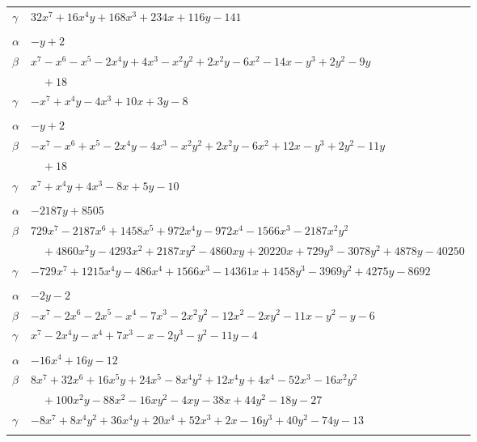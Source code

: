\documentclass[11pt]{article}
\begin{document}
\begin{longtable}{@{}ll@{}}
$\gamma$ & $32x^{7}+16x^{4}y+168x^{3}+234x+116y-141$\\
\addlinespace[3pt]
\multicolumn{2}{@{}l}{$\{i,j\}=\{20,31\}$, $k_{ij}=2\cdot 3$}\\
$\alpha$ & $-y+2$\\
$\beta$ & $x^{7}-x^{6}-x^{5}-2x^{4}y+4x^{3}-x^{2}y^{2}+2x^{2}y-6x^{2}-14x-y^{3}+2y^{2}-9y$\\
 & $\quad +18$\\
$\gamma$ & $-x^{7}+x^{4}y-4x^{3}+10x+3y-8$\\
\addlinespace[3pt]
\multicolumn{2}{@{}l}{$\{i,j\}=\{20,34\}$, $k_{ij}=2^{3}$}\\
$\alpha$ & $-y+2$\\
$\beta$ & $-x^{7}-x^{6}+x^{5}-2x^{4}y-4x^{3}-x^{2}y^{2}+2x^{2}y-6x^{2}+12x-y^{3}+2y^{2}-11y$\\
 & $\quad +18$\\
$\gamma$ & $x^{7}+x^{4}y+4x^{3}-8x+5y-10$\\
\addlinespace[3pt]
\multicolumn{2}{@{}l}{$\{i,j\}=\{21,35\}$, $k_{ij}=11\cdot 17$}\\
$\alpha$ & $-2187y+8505$\\
$\beta$ & $729x^{7}-2187x^{6}+1458x^{5}+972x^{4}y-972x^{4}-1566x^{3}-2187x^{2}y^{2}$\\
 & $\quad +4860x^{2}y-4293x^{2}+2187xy^{2}-4860xy+20220x+729y^{3}-3078y^{2}+4878y-40250$\\
$\gamma$ & $-729x^{7}+1215x^{4}y-486x^{4}+1566x^{3}-14361x+1458y^{3}-3969y^{2}+4275y-8692$\\
\addlinespace[3pt]
\multicolumn{2}{@{}l}{$\{i,j\}=\{22,25\}$, $k_{ij}=2$}\\
$\alpha$ & $-2y-2$\\
$\beta$ & $-x^{7}-2x^{6}-2x^{5}-x^{4}-7x^{3}-2x^{2}y^{2}-12x^{2}-2xy^{2}-11x-y^{2}-y-6$\\
$\gamma$ & $x^{7}-2x^{4}y-x^{4}+7x^{3}-x-2y^{3}-y^{2}-11y-4$\\
\addlinespace[3pt]
\multicolumn{2}{@{}l}{$\{i,j\}=\{22,29\}$, $k_{ij}=5^{2}$}\\
$\alpha$ & $-16x^{4}+16y-12$\\
$\beta$ & $8x^{7}+32x^{6}+16x^{5}y+24x^{5}-8x^{4}y^{2}+12x^{4}y+4x^{4}-52x^{3}-16x^{2}y^{2}$\\
 & $\quad +100x^{2}y-88x^{2}-16xy^{2}-4xy-38x+44y^{2}-18y-27$\\
$\gamma$ & $-8x^{7}+8x^{4}y^{2}+36x^{4}y+20x^{4}+52x^{3}+2x-16y^{3}+40y^{2}-74y-13$\\
\addlinespace[3pt]
\multicolumn{2}{@{}l}{$\{i,j\}=\{22,32\}$, $k_{ij}=1$}\\

\end{longtable}
\end{document}
